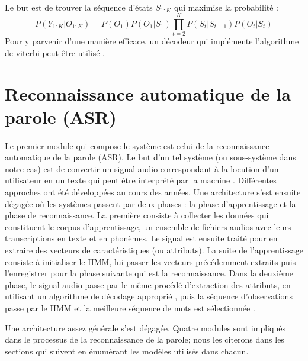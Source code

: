 \paragraph{}
Le but est de trouver la séquence d'états $S_{1:K}$ qui maximise la probabilité \citep{hmm_intro} : 
\begin{equation}
P(Y_{1:K} | O_{1:K}) = P(O_1)P(O_1|S_1)\prod_{t=2}^{K}P(S_t|S_{t-1})P(O_t|S_t) 
\end{equation}
Pour y parvenir d'une manière efficace, un décodeur qui implémente l'algorithme de viterbi peut être utilisé \citep{viterbi,viterbi_hmm}.

\section{Reconnaissance automatique de la parole (ASR)}
\paragraph{}
Le premier module qui compose le système est celui de la reconnaissance automatique de la parole (ASR). Le but d'un tel système (ou sous-système dans notre cas) est de convertir un signal audio correspondant à la locution d'un utilisateur en un texte qui peut être interprété par la machine \citep{asr_definition}. Différentes approches ont été développées au cours des années. Une architecture s'est ensuite dégagée où les systèmes passent par deux phases : la phase d'apprentissage et la phase de reconnaissance. La première consiste à collecter les données qui constituent le corpus d'apprentissage, un ensemble de fichiers audios avec leurs transcriptions en texte et en phonèmes. Le signal est ensuite traité pour en extraire des vecteurs de caractéristiques (ou attributs). La suite de l'apprentissage consiste à initialiser le HMM, lui passer les vecteurs précédemment extraits puis l'enregistrer pour la phase suivante qui est la reconnaissance. Dans la deuxième phase, le signal audio passe par le même procédé d'extraction des attributs, en utilisant un algorithme de décodage approprié \citep{viterbi_hmm}, puis la séquence d'observations passe par le HMM et la meilleure séquence de mots est sélectionnée \citep{speech_reco_Yu2015}.
\par Une architecture assez générale s'est dégagée. Quatre modules sont impliqués dans le processus de la reconnaissance de la parole; nous les citerons dans les sections qui suivent en énumérant les modèles utilisés dans chacun.

